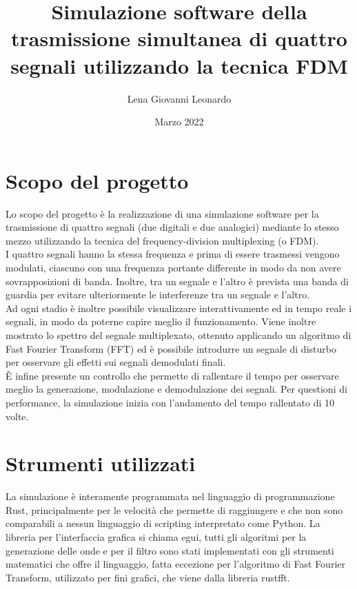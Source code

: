 \documentclass{article}
\title{Simulazione software della trasmissione simultanea di quattro segnali utilizzando la tecnica FDM}
\author{Lena Giovanni Leonardo}
\date{Marzo 2022}
\begin{document}
\maketitle

\section{Scopo del progetto}
Lo scopo del progetto è la realizzazione di una simulazione software per la trasmissione di quattro segnali (due digitali
e due analogici) mediante lo stesso mezzo utilizzando la tecnica del frequency-division multiplexing (o FDM).\\
I quattro segnali hanno la stessa frequenza e prima di essere trasmessi vengono modulati, ciascuno con una frequenza
portante differente in modo da non avere sovrapposizioni di banda. Inoltre, tra un segnale e l'altro è prevista una
banda di guardia per evitare ulteriormente le interferenze tra un segnale e l'altro.\\
Ad ogni stadio è inoltre possibile visualizzare interattivamente ed in tempo reale i segnali, in modo da poterne capire
meglio il funzionamento. Viene inoltre mostrato lo spettro del segnale multiplexato, ottenuto applicando un algoritmo di
Fast Fourier Transform (FFT) ed è possibile introdurre un segnale di disturbo per osservare gli effetti sui segnali demodulati
finali.\\
È infine presente un controllo che permette di rallentare il tempo per osservare meglio la generazione, modulazione e demodulazione
dei segnali. Per questioni di performance, la simulazione inizia con l'andamento del tempo rallentato di 10 volte.

\section{Strumenti utilizzati}
La simulazione è interamente programmata nel linguaggio di programmazione Rust, principalmente per le velocità che
permette di raggiungere e che non sono comparabili a nessun linguaggio di scripting interpretato come Python. La libreria
per l'interfaccia grafica si chiama egui, tutti gli algoritmi per la generazione delle onde e per il filtro sono stati
implementati con gli strumenti matematici che offre il linguaggio, fatta eccezione per l'algoritmo di Fast Fourier Transform,
utilizzato per fini grafici, che viene dalla libreria rustfft.
\end{document}
